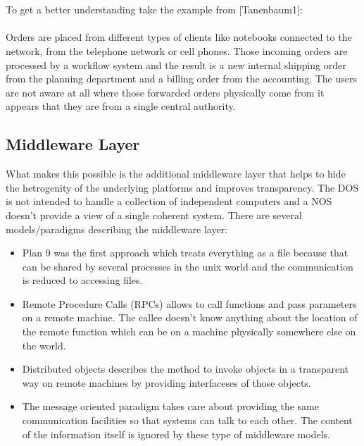 \documentclass[a4paper,titlepage,11pt,DIV10,BCOR0.5cm,headinclude]{article}
\begin{document}
\\\\
To get a better understanding take the example from [Tanenbaum1]:
\\\\
Orders are placed from different types of clients like notebooks connected to the network, from the telephone network or cell phones. Those incoming orders are processed by a workflow system and the result is a new internal shipping order from the planning department and a billing order from the accounting. The users are not aware at all where those forwarded orders physically come from it appears that they are from a single central authority.
\subsection{Middleware Layer}
What makes this possible is the additional middleware layer that helps to hide the hetrogenity of the underlying platforms and improves transparency. The DOS is not intended to handle a collection of independent computers and a NOS doesn't provide a  view of a single coherent system. There are several models/paradigms describing the middleware layer:
\begin{itemize}
	\item Plan 9 was the first approach which treats everything as a file because that can be shared by several processes in the unix world and the communication is reduced to accessing files.
	\item Remote Procedure Calls (RPCs) allows to call functions and pass parameters on a remote machine. The callee doesn't know anything about the location of the remote function which can be on a machine physically somewhere else on the world.
	\item Distributed objects describes the method to invoke objects in a transparent way on remote machines by providing interfaceses of those objects.
	\item The message oriented paradigm takes care about providing the same communication facilities so that systems can talk to each other. The content of the information itself is ignored by these type of middleware models.
\end{itemize}
\end{document}
